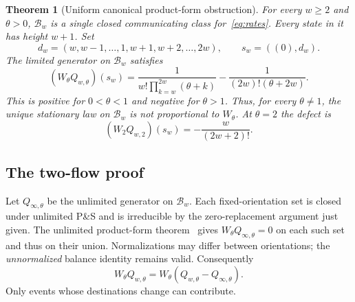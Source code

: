 \documentclass[11pt]{article}
\newtheorem{theorem}{Theorem}
\theoremstyle{remark}
\newcommand{\B}{\mathcal B_w}
\newcommand{\W}{W_\theta}
\newcommand{\Qw}{Q_{w,\theta}}
\newcommand{\Qi}{Q_{\infty,\theta}}
\begin{document}
\begin{theorem}[Uniform canonical product-form obstruction]\label{thm:balanced}
For every $w\ge2$ and $\theta>0$, $\B$ is a single closed communicating class for~\eqref{eq:rates}. Every state in it has height $w+1$. Set
\[
 d_w=(w,w-1,\ldots,1,w+1,w+2,\ldots,2w),\qquad s_w=((0),d_w).
\]
The limited generator on $\B$ satisfies
\begin{equation}\label{eq:main}
 (\W\Qw)(s_w)=
 \frac{1}{w!\prod_{k=w}^{2w}(\theta+k)}
 -\frac{1}{(2w)!(\theta+2w)}.
\end{equation}
This is positive for $0<\theta<1$ and negative for $\theta>1$. Thus, for every $\theta\ne1$, the unique stationary law on $\B$ is not proportional to $\W$. At $\theta=2$ the defect is
\begin{equation}\label{eq:factorial}
 \boxed{(W_2Q_{w,2})(s_w)=-\frac{w}{(2w+2)!}.}
\end{equation}
\end{theorem}
\subsection{The two-flow proof}\label{sec:balance}
Let $\Qi$ be the unlimited generator on $\B$. Each fixed-orientation set is closed under unlimited P\&S and is irreducible by the zero-replacement argument just given. The unlimited product-form theorem~\cite[Theorem~3, Eq.~(8), p.~217]{DG} gives $\W\Qi=0$ on each such set and thus on their union. Normalizations may differ between orientations; the \emph{unnormalized} balance identity remains valid. Consequently
\begin{equation}\label{eq:subtract}
 \W\Qw=\W(\Qw-\Qi).
\end{equation}
Only events whose destinations change can contribute.
\end{document}
